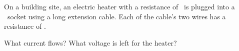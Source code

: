 On a building site, an electric heater with a resistance of \RO\ is plugged into a \VzO\ socket using a long extension cable. Each of the cable's two wires has a resistance of \rwO.

\begin{abcliste}
\abc What current flows?
\abc What voltage is left for the heater?
\end{abcliste}
